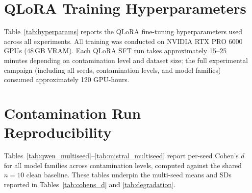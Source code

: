 \section{QLoRA Training Hyperparameters}
\label{app:hyperparams}

Table~\ref{tab:hyperparams} reports the QLoRA fine-tuning hyperparameters used across all experiments.
All training was conducted on NVIDIA RTX PRO 6000 GPUs (48\,GB VRAM).
Each QLoRA SFT run takes approximately 15--25 minutes depending on contamination level and dataset size; the full experimental campaign (including all seeds, contamination levels, and model families) consumed approximately 120 GPU-hours.

\begin{table}[t]
\centering
\caption{QLoRA fine-tuning hyperparameters (shared across all model families and contamination conditions).}
\label{tab:hyperparams}
\footnotesize
{}
\end{table}

\section{Contamination Run Reproducibility}\label{app:reproducibility}

Tables~\ref{tab:qwen_multiseed}--\ref{tab:mistral_multiseed} report per-seed Cohen's $d$ for all model families across contamination levels, computed against the shared $n{=}10$ clean baseline.
These tables underpin the multi-seed means and SDs reported in Tables~\ref{tab:cohens_d} and \ref{tab:degradation}.

